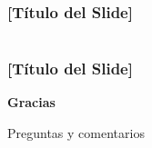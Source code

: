 \documentclass[11pt, aspectratio=169, spanish]{beamer}
\begin{document}
\begin{frame}[plain]
\frametitle{[Título del Slide]}

\vspace{0.1cm}

\begin{columns}[t]




\end{columns}
\end{frame}

\begin{frame}[plain]
\frametitle{[Título del Slide]}

\vspace{0.3cm}


\end{frame}

\begin{frame}[plain]

\vspace*{1cm}


\end{frame}

\begin{frame}[plain]
\vspace*{1.5cm}
\begin{center}
{\Huge\textcolor{VerdeUNAL}{\textbf{Gracias}}}

\vspace{0.8cm}

{\large Preguntas y comentarios}

\vspace{1cm}

\textcolor{VerdeUNAL}{\large {}  }
\end{center}
\end{frame}
\end{document}
